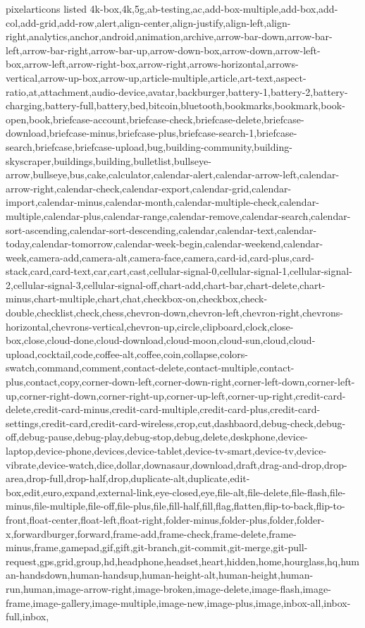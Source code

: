 \documentclass[aspectratio=169,t]{beamer}
\begin{document}
\begin{frame}[allowframebreaks]{pixelarticons listed}
 {
	4k-box,4k,5g,ab-testing,ac,add-box-multiple,add-box,add-col,add-grid,add-row,alert,align-center,align-justify,align-left,align-right,analytics,anchor,android,animation,archive,arrow-bar-down,arrow-bar-left,arrow-bar-right,arrow-bar-up,arrow-down-box,arrow-down,arrow-left-box,arrow-left,arrow-right-box,arrow-right,arrows-horizontal,arrows-vertical,arrow-up-box,arrow-up,article-multiple,article,art-text,aspect-ratio,at,attachment,audio-device,avatar,backburger,battery-1,battery-2,battery-charging,battery-full,battery,bed,bitcoin,bluetooth,bookmarks,bookmark,book-open,book,briefcase-account,briefcase-check,briefcase-delete,briefcase-download,briefcase-minus,briefcase-plus,briefcase-search-1,briefcase-search,briefcase,briefcase-upload,bug,building-community,building-skyscraper,buildings,building,bulletlist,bullseye-arrow,bullseye,bus,cake,calculator,calendar-alert,calendar-arrow-left,calendar-arrow-right,calendar-check,calendar-export,calendar-grid,calendar-import,calendar-minus,calendar-month,calendar-multiple-check,calendar-multiple,calendar-plus,calendar-range,calendar-remove,calendar-search,calendar-sort-ascending,calendar-sort-descending,calendar,calendar-text,calendar-today,calendar-tomorrow,calendar-week-begin,calendar-weekend,calendar-week,camera-add,camera-alt,camera-face,camera,card-id,card-plus,card-stack,card,card-text,car,cart,cast,cellular-signal-0,cellular-signal-1,cellular-signal-2,cellular-signal-3,cellular-signal-off,chart-add,chart-bar,chart-delete,chart-minus,chart-multiple,chart,chat,checkbox-on,checkbox,check-double,checklist,check,chess,chevron-down,chevron-left,chevron-right,chevrons-horizontal,chevrons-vertical,chevron-up,circle,clipboard,clock,close-box,close,cloud-done,cloud-download,cloud-moon,cloud-sun,cloud,cloud-upload,cocktail,code,coffee-alt,coffee,coin,collapse,colors-swatch,command,comment,contact-delete,contact-multiple,contact-plus,contact,copy,corner-down-left,corner-down-right,corner-left-down,corner-left-up,corner-right-down,corner-right-up,corner-up-left,corner-up-right,credit-card-delete,credit-card-minus,credit-card-multiple,credit-card-plus,credit-card-settings,credit-card,credit-card-wireless,crop,cut,dashbaord,debug-check,debug-off,debug-pause,debug-play,debug-stop,debug,delete,deskphone,device-laptop,device-phone,devices,device-tablet,device-tv-smart,device-tv,device-vibrate,device-watch,dice,dollar,downasaur,download,draft,drag-and-drop,drop-area,drop-full,drop-half,drop,duplicate-alt,duplicate,edit-box,edit,euro,expand,external-link,eye-closed,eye,file-alt,file-delete,file-flash,file-minus,file-multiple,file-off,file-plus,file,fill-half,fill,flag,flatten,flip-to-back,flip-to-front,float-center,float-left,float-right,folder-minus,folder-plus,folder,folder-x,forwardburger,forward,frame-add,frame-check,frame-delete,frame-minus,frame,gamepad,gif,gift,git-branch,git-commit,git-merge,git-pull-request,gps,grid,group,hd,headphone,headset,heart,hidden,home,hourglass,hq,human-handsdown,human-handsup,human-height-alt,human-height,human-run,human,image-arrow-right,image-broken,image-delete,image-flash,image-frame,image-gallery,image-multiple,image-new,image-plus,image,inbox-all,inbox-full,inbox,}
\end{frame}
\end{document}

